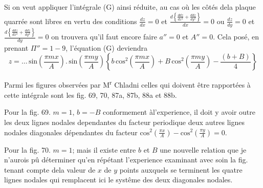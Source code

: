\documentclass[11pt,a4paper]{article}
\begin{document}
Si on veut appliquer l'intégrale (G) ainsi réduite, au cas où les côtés
dela plaque quarrée sont libres en vertu des conditions
$\frac{dz}{dx}=0$ et $\frac{d\left\{\frac{ddz}{dx^2}+\frac{ddz}{dy^2}\right\}}{dx}=0$ ou $\frac{dz}{dy}=0$ et $\frac{d\left\{\frac{ddz}{dx^2}+\frac{ddz}{dy^2}\right\}}{dy}=0$
on trouvera qu'il faut encore faire $a''=0$ et $A''=0$.
Cela posé, en prenant $\Pi''=1-9$, l'équation (G) deviendra
\[ z = \ldots\,\text{sin}\left(\frac{\pi mx}{A}\right).\,\text{sin}\left(\frac{\pi my}{A}\right)\left\{b\,\text{cos}^2\left(\frac{\pi mx}{A}\right) + B\,\text{cos}^2\left(\frac{\pi my}{A}\right) - \frac{(b+B)}{4}\right\} \]

Parmi les figures observées par M\textsuperscript{r} Chladni celles qui doivent
être rapportées à cette intégrale sont les fig. 69, 70,
87a, 87b, 88a et 88b.

Pour la fig. 69. $m=1$, $b=-B$ conformement àl'experience, il doit y avoir
outre les deux lignes nodales dependantes du facteur periodique deux autres
lignes nodales diagonales dépendantes du facteur $\text{cos}^2\left(\frac{\pi x}{A}\right) - \text{cos}^2\left(\frac{\pi y}{A}\right) = 0$.

Pour la fig. 70. $m=1$; mais il existe entre $b$ et $B$ une nouvelle
relation que je n'aurois pû déterminer qu'en répétant l'experience 
examinant avec soin la fig.  tenant compte dela
 valeur de $x$  de $y$   points  auxquels  se terminent
 les quatre lignes nodales
qui remplacent ici le  systême des deux diagonales nodales.
\end{document}
